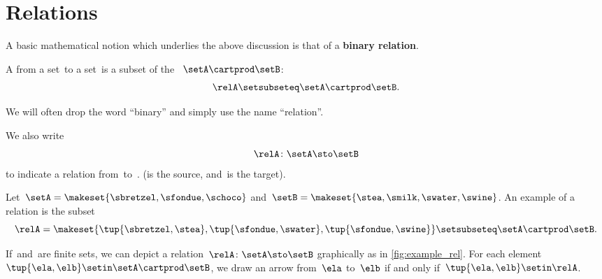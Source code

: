 
\section{Relations}
\label{sec:connection-relations}

A basic mathematical notion which underlies the above discussion is that of a \textbf{binary relation}.

\begin{ctdefinition}
    \label{def:binary-relation}
    A  \relA from a set~\setA to a set~\setB is a subset of the ~$\setA\cartprod \setB$:
    \begin{equation}
        \relA \setsubseteq \setA \cartprod \setB.
    \end{equation}
\end{ctdefinition}

We will often drop the word ``binary'' and simply use the name ``relation''.

We also write
\begin{equation}
    \relA \colon \setA \sto \setB
\end{equation}
to indicate a relation from~\setA to~\setB.
(\setA is the source, and~\setB is the target).

\begin{marginfigure}
    \centering
    \caption{Relation of \cref{exa:simple-rel}.}
    \label{fig:example_rel}
\end{marginfigure}

\begin{example}
    \label{exa:simple-rel}
    Let~$\setA = \makeset{ \sbretzel, \sfondue, \schoco}$ and~$\setB = \makeset{ \stea, \smilk, \swater, \swine }$.
    An example of a relation is the subset
    \begin{equation}
        \relA = \makeset{ \tup{\sbretzel, \stea}, \tup{\sfondue, \swater}, \tup{\sfondue, \swine} } \setsubseteq \setA \cartprod \setB.
    \end{equation}
\end{example}

If~\setA and~\setB are finite sets, we can depict a relation~$\relA \colon \setA \sto \setB$ graphically as in \cref{fig:example_rel}.
For each element~$\tup{\ela,\elb} \setin \setA \cartprod \setB$, we draw an arrow from~$\ela$ to~$\elb$ if and only if~$\tup{\ela,\elb} \setin \relA$.

